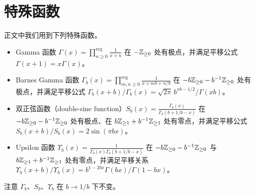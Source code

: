 \appendix
\section{特殊函数}

正文中我们用到下列特殊函数。

\begin{itemize}[leftmargin=1.4em,itemsep=4pt,topsep=3pt]
  \item Gamma 函数 $\Gamma(x)=\prod_{n\ge0}^{\mathrm{reg}}\frac{1}{x+n}$ 在 $-\mathbb{Z}_{\ge0}$ 处有极点，并满足平移公式 $\Gamma(x+1)=x\Gamma(x)$。


  \item Barnes Gamma 函数 $\Gamma_b(x)=\prod_{m,n\ge0}^{\mathrm{reg}}\frac{1}{x+mb+n/b}$ 在 $-b\mathbb{Z}_{\ge0}-b^{-1}\mathbb{Z}_{\ge0}$ 处有极点，并满足平移公式 $\Gamma_b(x+b)/\Gamma_b(x)=\sqrt{2\pi}\,b^{xb-1/2}/\Gamma(xb)$。
  \item 双正弦函数（double-sine function）$S_b(x)=\frac{\Gamma_b(x)}{\Gamma_b(b+1/b-x)}$ 在 $-b\mathbb{Z}_{\ge0}-b^{-1}\mathbb{Z}_{\ge0}$ 处有极点、在 $b\mathbb{Z}_{\ge1}+b^{-1}\mathbb{Z}_{\ge1}$ 处有零点，并满足平移公式 $S_b(x+b)/S_b(x)=2\sin(\pi bx)$。
  \item Upsilon 函数 $\Upsilon_b(x)=\frac{1}{\Gamma_b(x)\Gamma_b(b+1/b-x)}$ 在 $-b\mathbb{Z}_{\ge0}-b^{-1}\mathbb{Z}_{\ge0}$ 与 $b\mathbb{Z}_{\ge1}+b^{-1}\mathbb{Z}_{\ge1}$ 处有零点，并满足平移关系 $\Upsilon_b(x+b)/\Upsilon_b(x)=b^{1-2bx}\Gamma(bx)/\Gamma(1-bx)$。
\end{itemize}

注意 $\Gamma_b$、$S_b$、$\Upsilon_b$ 在 $b\to1/b$ 下不变。



